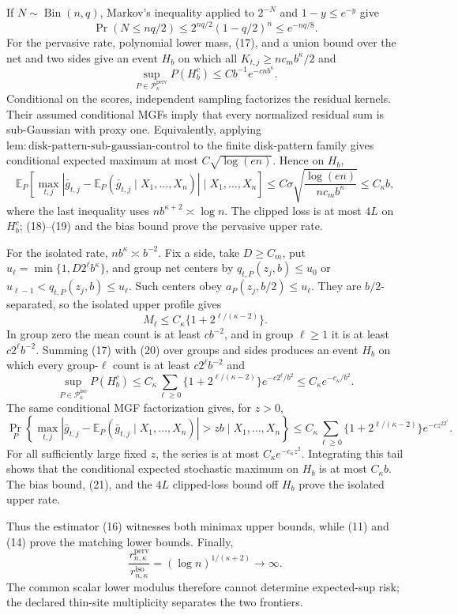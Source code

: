 If \(N\sim\operatorname{Bin}(n,q)\), Markov's inequality applied to \(2^{-N}\) and \(1-y\le e^{-y}\) give
\[
 \Pr(N\le nq/2)\le2^{nq/2}(1-q/2)^n\le e^{-nq/8}. \tag{17}
\]
For the pervasive rate, polynomial lower mass, (17), and a union bound over the net and two sides give an event \(H_b\) on which all \(K_{t,j}\ge nc_mb^\kappa/2\) and
\[
 \sup_{P\in\mathcal P_\kappa^{\mathrm{perv}}}P(H_b^c)
 \le Cb^{-1}e^{-cnb^\kappa}. \tag{18}
\]
Conditional on the scores, independent sampling factorizes the residual kernels.  Their assumed conditional MGFs imply that every normalized residual sum is sub-Gaussian with proxy one.  Equivalently, applying \(\mathrm{lem:disk\text{-}pattern\text{-}sub\text{-}gaussian\text{-}control}\) to the finite disk-pattern family gives conditional expected maximum at most \(C\sqrt{\log(en)}\).  Hence on \(H_b\),
\[
 \mathbb E_P\!\left[
 \max_{t,j}|\bar g_{t,j}-\mathbb E_P(\bar g_{t,j}\mid X_1,\ldots,X_n)|
 \mid X_1,\ldots,X_n\right]
 \le C\sigma\sqrt{\frac{\log(en)}{nc_mb^\kappa}}\le C_\kappa b, \tag{19}
\]
where the last inequality uses \(nb^{\kappa+2}\asymp\log n\).  The clipped loss is at most \(4L\) on \(H_b^c\); (18)--(19) and the bias bound prove the pervasive upper rate.

For the isolated rate, \(nb^\kappa\asymp b^{-2}\).  Fix a side, take \(D\ge C_m\), put \(u_\ell=\min\{1,D2^\ell b^\kappa\}\), and group net centers by \(q_{t,P}(z_j,b)\le u_0\) or \(u_{\ell-1}<q_{t,P}(z_j,b)\le u_\ell\).  Such centers obey \(a_P(z_j,b/2)\le u_\ell\).  They are \(b/2\)-separated, so the isolated upper profile gives
\[
 M_\ell\le C_\kappa\{1+2^{\ell/(\kappa-2)}\}. \tag{20}
\]
In group zero the mean count is at least \(cb^{-2}\), and in group \(\ell\ge1\) it is at least \(c2^\ell b^{-2}\).  Summing (17) with (20) over groups and sides produces an event \(H_b\) on which every group-\(\ell\) count is at least \(c2^\ell b^{-2}\) and
\[
 \sup_{P\in\mathcal P_\kappa^{\mathrm{iso}}}P(H_b^c)
 \le C_\kappa\sum_{\ell\ge0}\{1+2^{\ell/(\kappa-2)}\}e^{-c2^\ell/b^2}
 \le C_\kappa e^{-c_\kappa/b^2}. \tag{21}
\]
The same conditional MGF factorization gives, for \(z>0\),
\[
 \Pr_P\!\left\{
 \max_{t,j}|\bar g_{t,j}-\mathbb E_P(\bar g_{t,j}\mid X_1,\ldots,X_n)|>zb
 \mid X_1,\ldots,X_n\right\}
 \le C_\kappa\sum_{\ell\ge0}\{1+2^{\ell/(\kappa-2)}\}e^{-cz^22^\ell}. \tag{22}
\]
For all sufficiently large fixed \(z\), the series is at most \(C_\kappa e^{-c_\kappa z^2}\).  Integrating this tail shows that the conditional expected stochastic maximum on \(H_b\) is at most \(C_\kappa b\).  The bias bound, (21), and the \(4L\) clipped-loss bound off \(H_b\) prove the isolated upper rate.

Thus the estimator (16) witnesses both minimax upper bounds, while (11) and (14) prove the matching lower bounds.  Finally,
\[
 \frac{r_{n,\kappa}^{\mathrm{perv}}}{r_{n,\kappa}^{\mathrm{iso}}}
 =(\log n)^{1/(\kappa+2)}\longrightarrow\infty.
\]
The common scalar lower modulus therefore cannot determine expected-sup risk; the declared thin-site multiplicity separates the two frontiers.